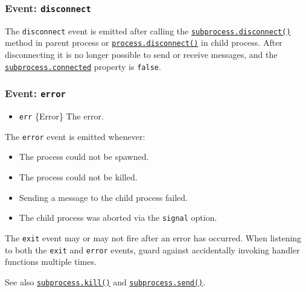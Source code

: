 \subsubsection{\texorpdfstring{Event:
\texttt{\textquotesingle{}disconnect\textquotesingle{}}}{Event: \textquotesingle disconnect\textquotesingle{}}}\label{event-disconnect}

The \texttt{\textquotesingle{}disconnect\textquotesingle{}} event is
emitted after calling the
\hyperref[subprocessdisconnect]{\texttt{subprocess.disconnect()}} method
in parent process or
\href{process.md\#processdisconnect}{\texttt{process.disconnect()}} in
child process. After disconnecting it is no longer possible to send or
receive messages, and the
\hyperref[subprocessconnected]{\texttt{subprocess.connected}} property
is \texttt{false}.

\subsubsection{\texorpdfstring{Event:
\texttt{\textquotesingle{}error\textquotesingle{}}}{Event: \textquotesingle error\textquotesingle{}}}\label{event-error}

\begin{itemize}
\tightlist
\item
  \texttt{err} \{Error\} The error.
\end{itemize}

The \texttt{\textquotesingle{}error\textquotesingle{}} event is emitted
whenever:

\begin{itemize}
\tightlist
\item
  The process could not be spawned.
\item
  The process could not be killed.
\item
  Sending a message to the child process failed.
\item
  The child process was aborted via the \texttt{signal} option.
\end{itemize}

The \texttt{\textquotesingle{}exit\textquotesingle{}} event may or may
not fire after an error has occurred. When listening to both the
\texttt{\textquotesingle{}exit\textquotesingle{}} and
\texttt{\textquotesingle{}error\textquotesingle{}} events, guard against
accidentally invoking handler functions multiple times.

See also \hyperref[subprocesskillsignal]{\texttt{subprocess.kill()}} and
\hyperref[subprocesssendmessage-sendhandle-options-callback]{\texttt{subprocess.send()}}.

